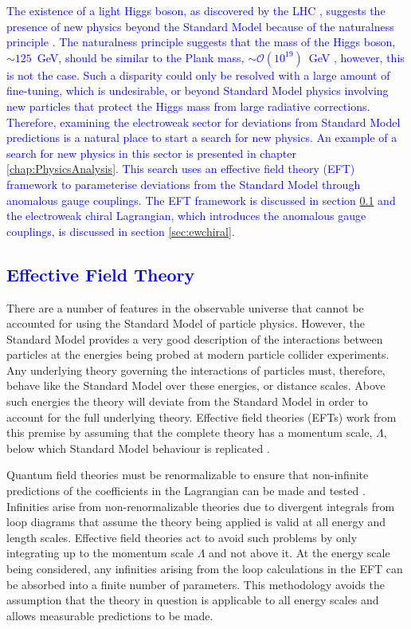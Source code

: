 \textcolor{blue}{The existence of a light Higgs boson, as discovered by the LHC \cite{Chatrchyan:2012xdj, Aad:2012tfa}, suggests the presence of new physics beyond the Standard Model because of the naturalness principle \cite{tHooft:1979rat}.  The naturalness principle suggests that the mass of the Higgs boson, $\sim 125$~GeV, should be similar to the Plank mass, $\sim \mathcal{O}(10^{19})$~GeV \cite{Olive:2016xmw}, however, this is not the case.  Such a disparity could only be resolved with a large amount of fine-tuning, which is undesirable, or beyond Standard Model physics involving new particles that protect the Higgs mass from large radiative corrections.  Therefore, examining the electroweak sector for deviations from Standard Model predictions is a natural place to start a search for new physics.  An example of a search for new physics in this sector is presented in chapter \ref{chap:PhysicsAnalysis}.  This search uses an effective field theory (EFT) framework to parameterise deviations from the Standard Model through anomalous gauge couplings.  The EFT framework is discussed in section \ref{sec:eft} and the electroweak chiral Lagrangian, which introduces the anomalous gauge couplings, is discussed in section \ref{sec:ewchiral}.}


\subsection{\textcolor{blue}{Effective Field Theory}}
\label{sec:eft}
There are a number of features in the observable universe that cannot be accounted for using the Standard Model of particle physics.  However, the Standard Model provides a very good description of the interactions between particles at the energies being probed at modern particle collider experiments.  Any underlying theory governing the interactions of particles must, therefore, behave like the Standard Model over these energies, or distance scales.  Above such energies the theory will deviate from the Standard Model in order to account for the full underlying theory.  Effective field theories (EFTs) work from this premise by assuming that the complete theory has a momentum scale, $\Lambda$, below which Standard Model behaviour is replicated \cite{Degrande:2013rea, Arzt:1993gz}.  

Quantum field theories must be renormalizable to ensure that non-infinite predictions of the coefficients in the Lagrangian can be made and tested \cite{Gripaios:2015qya}.  Infinities arise from non-renormalizable theories due to divergent integrals from loop diagrams that assume the theory being applied is valid at all energy and length scales.  Effective field theories act to avoid such problems by only integrating up to the momentum scale $\Lambda$ and not above it.  At the energy scale being considered, any infinities arising from the loop calculations in the EFT can be absorbed into a finite number of parameters.  This methodology avoids the assumption that the theory in question is applicable to all energy scales and allows measurable predictions to be made.  

